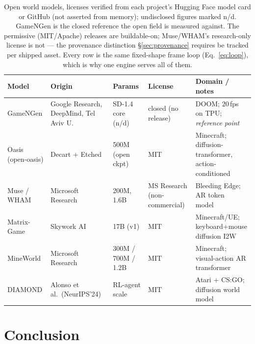 \documentclass[11pt]{article}
\begin{document}
\begin{table}[t]
\centering
\small
\setlength{\tabcolsep}{5pt}
\begin{tabular}{@{}p{2.5cm}p{3.0cm}p{2.1cm}p{2.4cm}p{3.0cm}@{}}
\toprule
\textbf{Model} & \textbf{Origin} & \textbf{Params} & \textbf{License} & \textbf{Domain / notes} \\
\midrule
GameNGen & Google Research, DeepMind, Tel Aviv U. & SD-1.4 core (n/d) & closed (no release) & DOOM; $20$\,fps on TPU; \emph{reference point}~\cite{gamengen} \\
Oasis (open-oasis) & Decart $+$ Etched & 500M (open ckpt) & MIT & Minecraft; diffusion-transformer, action-conditioned~\cite{oasis} \\
Muse / WHAM & Microsoft Research & 200M, 1.6B & MS Research (non-commercial) & Bleeding Edge; AR token model~\cite{wham} \\
Matrix-Game & Skywork AI & 17B (v1) & MIT & Minecraft/UE; keyboard$+$mouse diffusion I2W~\cite{matrixgame} \\
MineWorld & Microsoft Research & 300M / 700M / 1.2B & MIT & Minecraft; visual-action AR transformer~\cite{mineworld} \\
DIAMOND & Alonso et al.\ (NeurIPS'24) & RL-agent scale & MIT & Atari $+$ CS:GO; diffusion world model~\cite{diamond} \\
\bottomrule
\end{tabular}
\caption{Open world models, licenses verified from each project's Hugging Face model card or GitHub
 (not asserted from memory); undisclosed figures marked n/d. GameNGen is the closed reference the
open field is measured against. The permissive (MIT/Apache) releases are buildable-on; Muse/WHAM's research-only
license is not --- the provenance distinction \S\ref{sec:provenance} requires be tracked per shipped asset.
Every row is the same fixed-shape frame loop (Eq.~\eqref{eq:loop}), which is why one engine serves all of them.}
\label{tab:landscape}
\end{table}

\section{Conclusion}
\label{sec:conclusion}
\end{document}
